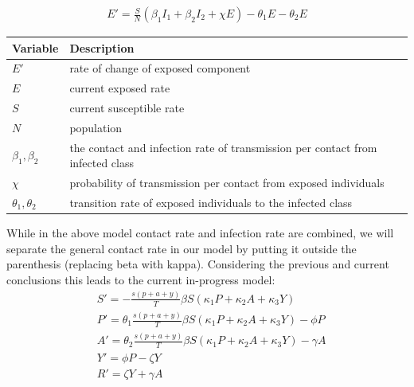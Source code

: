 \documentclass{article}
\begin{document}
\begin{align*}
  E' = \frac{S}{N} (\beta _1 I_1 + \beta _2 I_2 + \chi E) - \theta _1 E - \theta _2 E
\end{align*}

\begin{tabular}{|l | l |}
  \hline
  Variable                 & Description                                                                    \\ [0.5ex]
  \hline\hline
  $E'$                     & rate of change of exposed component                                            \\
  \hline
  $E$                      & current exposed rate                                                           \\
  \hline
  $S$                      & current susceptible rate                                                       \\
  \hline
  $N$                      & population                                                                     \\
  \hline
  $\beta _1 , \beta _2 $   & the contact and infection rate of transmission per contact from infected class \\
  \hline
  $\chi$                   & probability of transmission per contact from exposed individuals               \\
  \hline
  $\theta _1 , \theta _2 $ & transition rate of exposed individuals to the infected class                   \\
  \hline
\end{tabular}
\cite{dynamic}

While in the above model contact rate and infection rate are combined, we will separate the general contact rate in our model by putting it outside the parenthesis (replacing beta with kappa). Considering the previous and current conclusions this leads to the current in-progress model:
\begin{align*}
  & S' = - \frac{s(p+a+y)}{T} \beta S (\kappa _1 P + \kappa _2 A + \kappa _3 Y)                     \\
  & P' = \theta _ 1 \frac{s(p+a+y)}{T} \beta S (\kappa _1 P + \kappa _2 A + \kappa _3 Y) - \phi P   \\
  & A' = \theta _ 2 \frac{s(p+a+y)}{T} \beta S (\kappa _1 P + \kappa _2 A + \kappa _3 Y) - \gamma A \\
  & Y' = \phi P - \zeta Y                                                                           \\
  & R' = \zeta Y + \gamma A
\end{align*}
\end{document}
